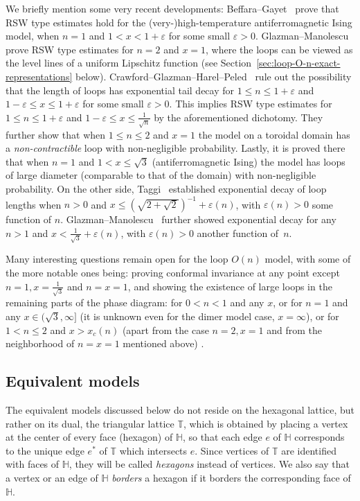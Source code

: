 \documentclass[12pt,reqno]{article}
\def\T{\mathbb{T}}
\def\eps{\varepsilon}
\newcommand{\HH}{\mathbb{H}}
\begin{document}
We briefly mention some very recent developments:
Beffara--Gayet~\cite{beffara2017percolation} prove that RSW type estimates hold for the (very-)high-temperature antiferromagnetic Ising model, when $n=1$ and $1<x<1+\eps$ for some small $\eps>0$. Glazman--Manolescu~\cite{glazman2018uniform} prove RSW type estimates for $n=2$ and $x=1$, where the loops can be viewed as the level lines of a uniform Lipschitz function (see Section~\ref{sec:loop-O-n-exact-representations} below). Crawford--Glazman--Harel--Peled~\cite{crawford2019} rule out the possibility that the length of loops has exponential tail decay for $1 \le n \le 1+\eps$ and $1 - \eps \le x \le 1+\eps$ for some small $\eps>0$. This implies RSW type estimates for $1\le n\le 1+\eps$ and $1-\eps\le x\le \frac{1}{\sqrt{n}}$ by the aforementioned dichotomy. They further show that when $1\le n\le 2$ and $x=1$ the model on a toroidal domain has a \emph{non-contractible} loop with non-negligible probability. Lastly, it is proved there that when $n=1$ and $1<x\le\sqrt{3}$ (antiferromagnetic Ising) the model has loops of large diameter (comparable to that of the domain) with non-negligible probability.
On the other side, Taggi~\cite{taggi2018shifted} established exponential decay of loop lengths when $n>0$ and $x\le (\sqrt{2+\sqrt{2}})^{-1} + \eps(n)$, with $\eps(n)>0$ some function of $n$. Glazman--Manolescu~\cite{glazman2018exponential} further showed exponential decay for any $n > 1$ and $x<\frac{1}{\sqrt{3}}+\eps(n)$, with $\eps(n)>0$ another function of~$n$.

Many interesting questions remain open for the loop $O(n)$ model, with some of the more notable ones being: proving conformal invariance at any point except $n=1, x=\frac{1}{\sqrt{3}}$ and $n=x=1$, and showing the existence of large loops in the remaining parts of the phase diagram: for $0<n<1$ and any $x$, or for $n=1$ and any $x\in(\sqrt{3},\infty]$ (it is unknown even for the dimer model case, $x=\infty$), or for $1<n\le 2$ and $x>x_c(n)$ (apart from the case $n=2, x=1$ and from the neighborhood of $n=x=1$ mentioned above) .

\subsection{Equivalent models}
The equivalent models discussed below do not reside on the hexagonal lattice, but rather on its dual, the triangular lattice $\T$, which is obtained by placing a vertex at the center of every face (hexagon) of $\HH$, so that each edge $e$ of $\HH$ corresponds to the unique edge $e^*$ of $\T$ which intersects $e$. Since vertices of $\T$ are identified
with faces of $\HH$, they will be called \emph{hexagons} instead of
vertices. We also say that a vertex or an edge of $\HH$
\emph{borders} a hexagon if it borders the corresponding face of
$\HH$.
\end{document}
